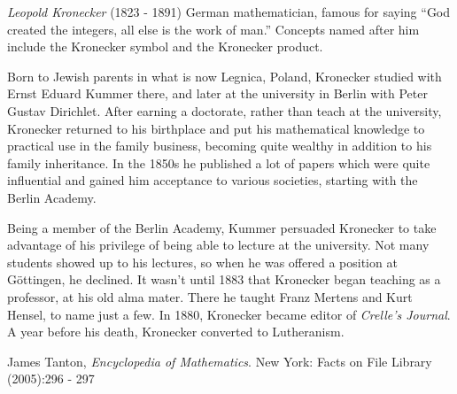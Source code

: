 \documentclass[12pt]{article}
\begin{document}
\emph{Leopold Kronecker} (1823 - 1891) German mathematician, famous for saying ``God created the integers, all else is the work of man.'' Concepts named after him include the Kronecker symbol and the Kronecker product.

Born to Jewish parents in what is now Legnica, Poland, Kronecker studied with Ernst Eduard Kummer there, and later at the university in Berlin with Peter Gustav Dirichlet. After earning a doctorate, rather than teach at the university, Kronecker returned to his birthplace and put his mathematical knowledge to practical use in the family business, becoming quite wealthy in addition to his family inheritance. In the 1850s he published a lot of papers which were quite influential and gained him acceptance to various societies, starting with the Berlin Academy.

Being a member of the Berlin Academy, Kummer persuaded Kronecker to take advantage of his privilege of being able to lecture at the university. Not many students showed up to his lectures, so when he was offered a position at G\"ottingen, he declined. It wasn't until 1883 that Kronecker began teaching as a professor, at his old alma mater. There he taught Franz Mertens and Kurt Hensel, to name just a few. In 1880, Kronecker became editor of {\it Crelle's Journal}. A year before his death, Kronecker converted to Lutheranism.

\begin{thebibliography}{1}
 James Tanton, {\it Encyclopedia of Mathematics}. New York: Facts on File Library (2005):296 - 297
\end{thebibliography}
\end{document}
